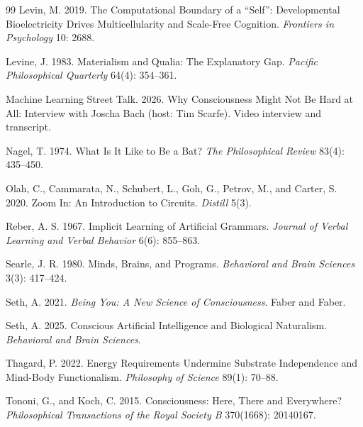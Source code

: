 \documentclass[11pt]{article}
\begin{document}
\begin{thebibliography}{99}
 Levin, M. 2019. The Computational Boundary of a ``Self'': Developmental Bioelectricity Drives Multicellularity and Scale-Free Cognition. \emph{Frontiers in Psychology} 10: 2688.

 Levine, J. 1983. Materialism and Qualia: The Explanatory Gap. \emph{Pacific Philosophical Quarterly} 64(4): 354--361.

 Machine Learning Street Talk. 2026. Why Consciousness Might Not Be Hard at All: Interview with Joscha Bach (host: Tim Scarfe). Video interview and transcript.

 Nagel, T. 1974. What Is It Like to Be a Bat? \emph{The Philosophical Review} 83(4): 435--450.

 Olah, C., Cammarata, N., Schubert, L., Goh, G., Petrov, M., and Carter, S. 2020. Zoom In: An Introduction to Circuits. \emph{Distill} 5(3).

 Reber, A. S. 1967. Implicit Learning of Artificial Grammars. \emph{Journal of Verbal Learning and Verbal Behavior} 6(6): 855--863.

 Searle, J. R. 1980. Minds, Brains, and Programs. \emph{Behavioral and Brain Sciences} 3(3): 417--424.

 Seth, A. 2021. \emph{Being You: A New Science of Consciousness}. Faber and Faber.

 Seth, A. 2025. Conscious Artificial Intelligence and Biological Naturalism. \emph{Behavioral and Brain Sciences}.

 Thagard, P. 2022. Energy Requirements Undermine Substrate Independence and Mind-Body Functionalism. \emph{Philosophy of Science} 89(1): 70--88.

 Tononi, G., and Koch, C. 2015. Consciousness: Here, There and Everywhere? \emph{Philosophical Transactions of the Royal Society B} 370(1668): 20140167.

\end{thebibliography}
\end{document}
